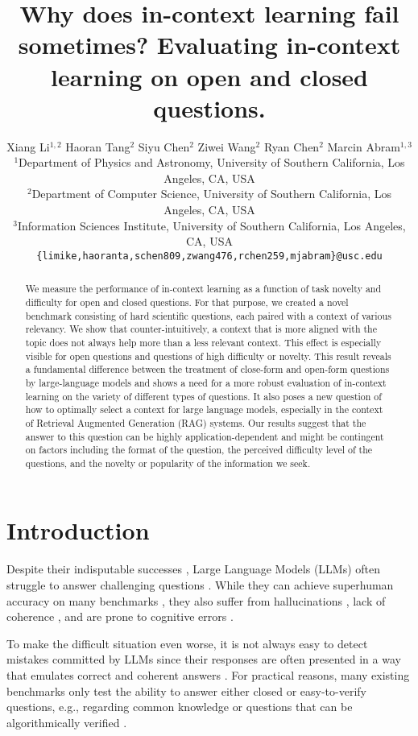 \documentclass{article}
\title{Why does in-context learning fail sometimes? Evaluating in-context learning on open and closed questions.}
\author{%
    Xiang Li$^{1, 2}$ \quad
    Haoran Tang$^{2}$ \quad
    Siyu Chen$^2$ \quad
    Ziwei Wang$^2$ \quad
    Ryan Chen$^2$ \quad
    Marcin Abram$^{1, 3}$\\[4pt]
    $^1$Department of Physics and Astronomy, University of Southern California, Los Angeles, CA, USA\\[2pt]
    $^2$Department of Computer Science, University of Southern California, Los Angeles, CA, USA\\[2pt]
    $^3$Information Sciences Institute, University of Southern California, Los Angeles, CA, USA\\[4pt]
    \texttt{\{limike,haoranta,schen809,zwang476,rchen259,mjabram\}@usc.edu}\\
}
\begin{document}
\maketitle

\begin{abstract}
    We measure the performance of in-context learning as a function of task novelty and difficulty for open and closed questions. For that purpose, we created a novel benchmark consisting of hard scientific questions, each paired with a context of various relevancy. We show that counter-intuitively, a context that is more aligned with the topic does not always help more than a less relevant context. This effect is especially visible for open questions and questions of high difficulty or novelty. This result reveals a fundamental difference between the treatment of close-form and open-form questions by large-language models and shows a need for a more robust evaluation of in-context learning on the variety of different types of questions. It also poses a new question of how to optimally select a context for large language models, especially in the context of Retrieval Augmented Generation (RAG) systems. Our results suggest that the answer to this question can be highly application-dependent and might be contingent on factors including the format of the question, the perceived difficulty level of the questions, and the novelty or popularity of the information we seek.
\end{abstract}

\section{Introduction}

    Despite their indisputable successes \citep{Bommasani2021, Drori_2022, Chang2024}, Large Language Models (LLMs) often struggle to answer challenging questions \citep{rawte2023troubling}. While they can achieve superhuman accuracy on many benchmarks \citep{Luo2024}, they also suffer from hallucinations \citep{Ye2023, Azamfirei2023}, lack of coherence \citep{Xie2023Qiming}, and are prone to cognitive errors \citep{Jones2022, Hagendorff2023}.

    To make the difficult situation even worse, it is not always easy to detect mistakes committed by LLMs since their responses are often presented in a way that emulates correct and coherent answers \citep{Bender2021, Scheurer2023}.
    For practical reasons, many existing benchmarks only test the ability to answer either closed \citep{Chang2024} or easy-to-verify questions, e.g., regarding common knowledge \citep{bisk2019piqa, clark2018think} or questions that can be algorithmically verified \citep{Srivastava2024}.
\end{document}
